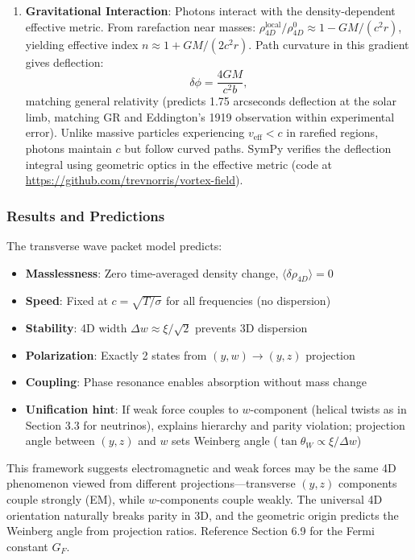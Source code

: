 \begin{enumerate}
\item \textbf{Gravitational Interaction}: Photons interact with the density-dependent effective metric. From rarefaction near masses: $\rho_{4D}^{\text{local}}/\rho_{4D}^0 \approx 1 - GM/(c^2r)$, yielding effective index $n \approx 1 + GM/(2c^2r)$. Path curvature in this gradient gives deflection:
   \[
   \delta\phi = \frac{4GM}{c^2b},
   \]
   matching general relativity (predicts 1.75 arcseconds deflection at the solar limb, matching GR and Eddington's 1919 observation within experimental error). Unlike massive particles experiencing $v_{\text{eff}} < c$ in rarefied regions, photons maintain $c$ but follow curved paths. SymPy verifies the deflection integral using geometric optics in the effective metric (code at \url{https://github.com/trevnorris/vortex-field}).
\end{enumerate}

\subsubsection{Results and Predictions}
The transverse wave packet model predicts:
\begin{itemize}
\item \textbf{Masslessness}: Zero time-averaged density change, $\langle\delta\rho_{4D}\rangle = 0$
\item \textbf{Speed}: Fixed at $c = \sqrt{T/\sigma}$ for all frequencies (no dispersion)
\item \textbf{Stability}: 4D width $\Delta w \approx \xi / \sqrt{2}$ prevents 3D dispersion
\item \textbf{Polarization}: Exactly 2 states from $(y,w) \to (y,z)$ projection
\item \textbf{Coupling}: Phase resonance enables absorption without mass change
\item \textbf{Unification hint}: If weak force couples to $w$-component (helical twists as in Section 3.3 for neutrinos), explains hierarchy and parity violation; projection angle between $(y,z)$ and $w$ sets Weinberg angle ($\tan\theta_W \propto \xi/\Delta w$)
\end{itemize}

This framework suggests electromagnetic and weak forces may be the same 4D phenomenon viewed from different projections---transverse $(y,z)$ components couple strongly (EM), while $w$-components couple weakly. The universal 4D orientation naturally breaks parity in 3D, and the geometric origin predicts the Weinberg angle from projection ratios. Reference Section 6.9 for the Fermi constant $G_F$.

